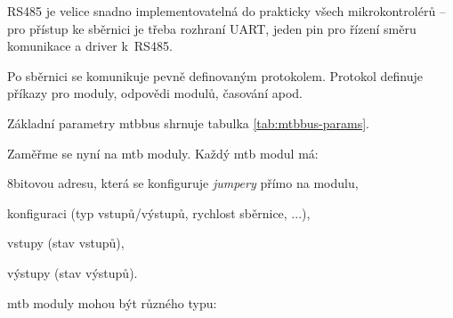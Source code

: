 RS485 je velice snadno implementovatelná do prakticky všech mikrokontrolérů –
pro přístup ke sběrnici je třeba rozhraní UART, jeden pin pro řízení směru
komunikace a driver k~RS485.

Po sběrnici se komunikuje pevně definovaným protokolem. Protokol definuje
příkazy pro moduly, odpovědi modulů, časování apod. \cite{mtbbus-specs}

Základní parametry \gls{mtbbus} shrnuje tabulka \ref{tab:mtbbus-params}.

Zaměřme se nyní na \gls{mtb} moduly. Každý \gls{mtb} modul má:

\begin{compactenum}
\item 8bitovou adresu, která se konfiguruje \textit{jumpery} přímo na modulu,
\item konfiguraci (typ vstupů/výstupů, rychlost sběrnice, ...),
\item vstupy (stav vstupů),
\item výstupy (stav výstupů).
\end{compactenum}

\gls{mtb} moduly mohou být různého typu:

